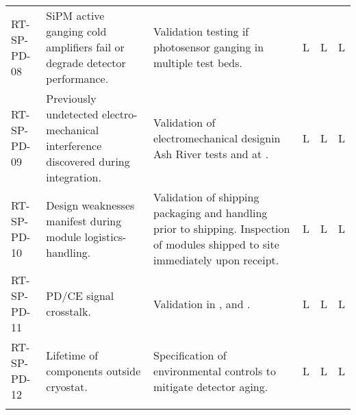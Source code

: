 \begin{footnotesize}
\begin{longtable}{P{0.18\textwidth}P{0.20\textwidth}P{0.32\textwidth}P{0.02\textwidth}P{0.02\textwidth}P{0.02\textwidth}}
RT-SP-PD-08 & SiPM active ganging cold amplifiers fail or degrade detector performance. & Validation testing if photosensor ganging in multiple test beds. & L & L & L \\  \colhline
RT-SP-PD-09 & Previously undetected electro-mechanical interference discovered during integration. & Validation of electromechanical designin Ash River tests and at . & L & L & L \\  \colhline
RT-SP-PD-10 & Design weaknesses manifest during module logistics-handling. & Validation of shipping packaging and handling prior to shipping.  Inspection of modules shipped to site immediately upon receipt. & L & L & L \\  \colhline
RT-SP-PD-11 & PD/CE signal crosstalk. & Validation in ,  and . & L & L & L \\  \colhline
RT-SP-PD-12 & Lifetime of  components outside cryostat. & Specification of environmental controls to mitigate detector aging. & L & L & L \\  \colhline

\label{tab:risks:SP-FD-PD}
\end{longtable}
\end{footnotesize}
